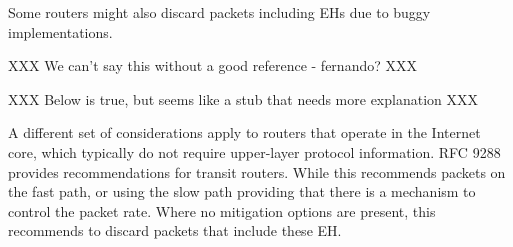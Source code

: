 \documentclass[conference]{IEEEtran}
\begin{document}
Some routers might also discard packets including EHs due to buggy implementations.

XXX We can't say this without a good reference - fernando? XXX

XXX Below is true, but seems like a stub that needs more explanation XXX

A different set of considerations apply to routers that operate in the Internet core, which typically do not require upper-layer protocol information.
RFC 9288~\cite{rfc9288}  provides recommendations for transit routers. While this recommends packets on the fast path, or using the slow path providing that there  is a mechanism to control the  packet rate. Where no mitigation options are present, this recommends to discard packets that include these EH. 






\end{document}
